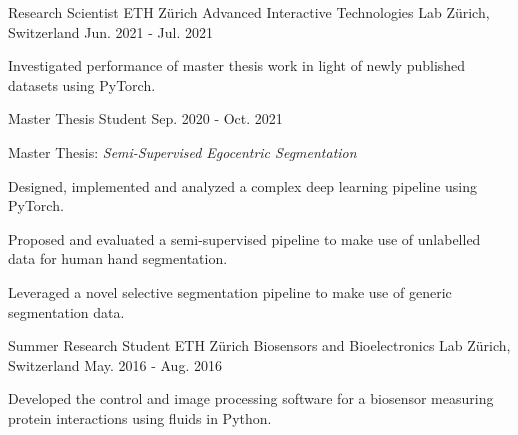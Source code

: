 

\begin{cventries}

  \cventry
    {Research Scientist} %
    {ETH Z\"urich Advanced Interactive Technologies Lab} %
    {Z\"urich, Switzerland} %
    {Jun. 2021 - Jul. 2021} %
    {
      \begin{cvitems} %
        \item {Investigated performance of master thesis work in light of newly published datasets using PyTorch.}
      \end{cvitems}
    }

\vspace*{-0.15cm}  
\cventry
    {Master Thesis Student} %
    {} %
    {} %
    {Sep. 2020 - Oct. 2021} %
    {
      \begin{cvitems} %
        \item {Master Thesis: \textit{Semi-Supervised Egocentric Segmentation}}
        \item Designed, implemented and analyzed a complex deep learning pipeline using PyTorch.
        \item {Proposed and evaluated a semi-supervised pipeline to make use of unlabelled data for human hand segmentation.}
        \item {Leveraged a novel selective segmentation pipeline to make use of generic segmentation data.}
      \end{cvitems}
    }

  \cventry
  {Summer Research Student} %
  {ETH Z\"urich Biosensors and Bioelectronics Lab} %
  {Z\"urich, Switzerland} %
  {May. 2016 - Aug. 2016} %
  {
    \begin{cvitems} %
      \item {Developed the control and image processing software for a biosensor measuring protein interactions using fluids in Python.}
    \end{cvitems}
  }

\end{cventries}
